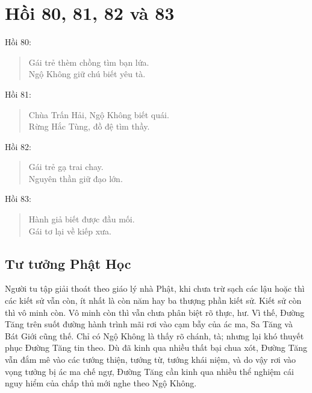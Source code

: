 \chapter{Hồi 80, 81, 82 và 83} %
\label{cha:hoi_80_81}

Hồi 80:

\begin{verse}
\begin{itshape}
Gái trẻ thèm chồng tìm bạn lứa.\\
Ngộ Không giữ chú biết yêu tà.
\end{itshape}
\end{verse}

Hồi 81:

\begin{verse}
\begin{itshape}
Chùa Trấn Hải, Ngộ Không biết quái.\\
Rừng Hắc Tùng, đồ đệ tìm thầy.
\end{itshape}
\end{verse}

Hồi 82:

\begin{verse}
\begin{itshape}
Gái trẻ gạ trai chay.\\
Nguyên thần giữ đạo lớn.
\end{itshape}
\end{verse}

Hồi 83:

\begin{verse}
\begin{itshape}
Hành giả biết được đầu mối.\\
Gái tơ lại về kiếp xưa.
\end{itshape}
\end{verse}

\section{Tư tưởng Phật Học} %
\label{sec:80_81_phat_hoc}

Người tu tập giải thoát theo giáo lý nhà Phật, khi chưa trừ sạch các lậu hoặc thì các kiết sử vẫn còn, ít nhất là còn năm hay ba thượng phần kiết sử. Kiết sử còn thì vô minh còn. Vô minh còn thì vẫn chưa phân biệt rõ thực, hư. Vì thế, Đường Tăng trên suốt đường hành trình mãi rơi vào cạm bẫy của ác ma, Sa Tăng và Bát Giới cũng thế. Chỉ có Ngộ Không là thấy rõ chánh, tà; nhưng lại khó thuyết phục Đường Tăng tin theo. Dù đã kinh qua nhiều thất bại chua xót, Đường Tăng vẫn đắm mê vào các tướng thiện, tướng từ, tướng khái niệm, và do vậy rơi vào vọng tưởng bị ác ma chế ngự, Đường Tăng cần kinh qua nhiều thể nghiệm cái nguy hiểm của chấp thủ mới nghe theo Ngộ Không.

